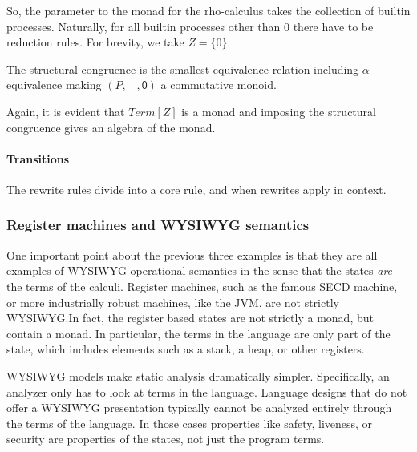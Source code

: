 So, the parameter to the monad for the rho-calculus takes the collection of builtin processes. Naturally, for all builtin processes other than $0$ there have to be reduction rules. For brevity, we take $Z = \{0\}$.

The structural congruence is the smallest equivalence relation including $\alpha$-equivalence making $(P,\;\mathsf{|}\;,\mathsf{0})$ a commutative monoid.

Again, it is evident that $Term[Z]$ is a monad and imposing the structural congruence gives an algebra of the monad.

\paragraph{Transitions}
The rewrite rules divide into a core rule, and when rewrites apply in
context.

\subsubsection{Register machines and WYSIWYG semantics}One important point about the previous three
examples is that they are all examples of WYSIWYG operational
semantics in the sense that the states \emph{are} the terms of the
calculi. Register machines, such as the famous SECD machine, or more industrially robust machines, like the JVM, are not strictly WYSIWYG.In fact, the register based states are not strictly a monad, but contain a monad. In particular, the terms in the language are only
part of the state, which includes elements such as a stack, a heap, or other registers.

WYSIWYG models make static analysis dramatically
simpler. Specifically, an analyzer only has to look at terms in the
language. Language designs that do not offer a WYSIWYG presentation
typically cannot be analyzed entirely through the terms of the
language. In those cases properties like safety, liveness, or security
are properties of the states, not just the program terms.
